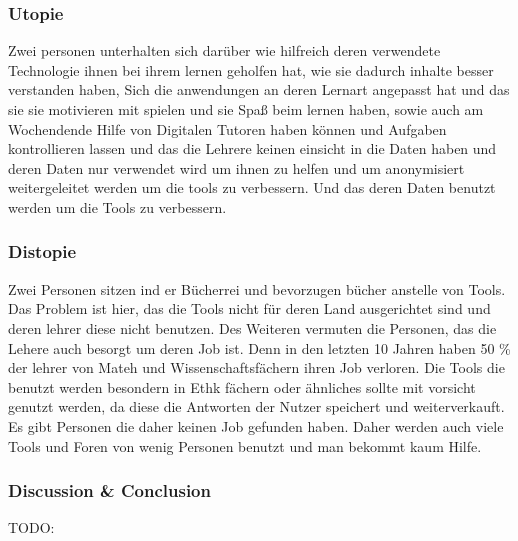 \subsubsection{Utopie}
Zwei personen unterhalten sich darüber wie hilfreich deren verwendete Technologie ihnen bei ihrem
lernen geholfen hat, wie sie dadurch inhalte besser verstanden haben, Sich die anwendungen an deren Lernart angepasst hat und das sie sie motivieren mit spielen und sie Spaß beim lernen haben, sowie auch am Wochendende Hilfe von Digitalen Tutoren haben können und Aufgaben kontrollieren lassen
und das die Lehrere keinen einsicht in die Daten haben und deren Daten nur verwendet wird um ihnen zu helfen und um anonymisiert weitergeleitet werden um die tools zu verbessern. Und das deren Daten benutzt werden um die Tools zu verbessern.
\subsubsection{Distopie}
Zwei Personen sitzen ind er Bücherrei und bevorzugen bücher anstelle von Tools. Das Problem ist hier, das die Tools nicht für deren Land ausgerichtet sind und deren lehrer diese nicht benutzen. 
Des Weiteren vermuten die Personen, das die Lehere auch besorgt um deren Job ist. Denn in den letzten 10 Jahren haben 50 \% der lehrer von Mateh und Wissenschaftsfächern ihren Job verloren.
Die Tools die benutzt werden besondern in Ethk fächern oder ähnliches sollte mit vorsicht genutzt werden, da diese die Antworten der Nutzer speichert und weiterverkauft. Es gibt Personen die daher keinen Job gefunden haben.
Daher werden auch viele Tools und Foren von wenig Personen benutzt und man bekommt kaum Hilfe.

\subsubsection{Discussion & Conclusion}
TODO: